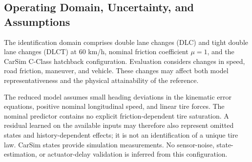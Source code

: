 \documentclass[10pt,journal]{IEEEtran}
\newcommand{\vect}[1]{\bm{#1}}
\newtheorem{assumption}{Assumption}
\begin{document}
%
%

\subsection{Operating Domain, Uncertainty, and Assumptions}
The identification domain comprises double lane changes (DLC) and tight double lane changes (DLCT) at 60 km/h, nominal friction coefficient $\mu=1$, and the CarSim C-Class hatchback configuration. Evaluation considers changes in speed, road friction, maneuver, and vehicle. These changes may affect both model representativeness and the physical attainability of the reference.

The reduced model assumes small heading deviations in the kinematic error equations, positive nominal longitudinal speed, and linear tire forces. The nominal predictor contains no explicit friction-dependent tire saturation. A residual learned on the available inputs may therefore also represent omitted states and history-dependent effects; it is not an identification of a unique tire law. CarSim states provide simulation measurements. No sensor-noise, state-estimation, or actuator-delay validation is inferred from this configuration.

\end{document}
